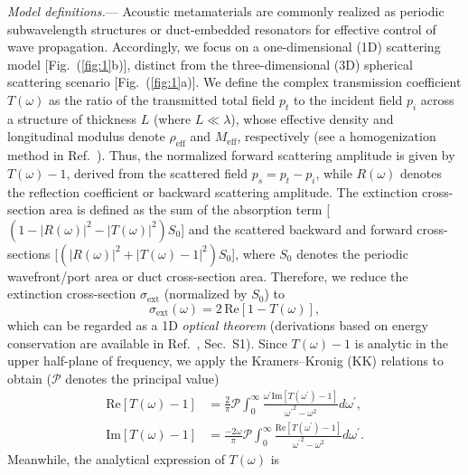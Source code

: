 \documentclass[final,5p,times,twocolumn]{elsarticle}
\begin{document}
\textit{Model definitions.}— Acoustic metamaterials are commonly realized as periodic subwavelength structures or duct-embedded resonators for effective control of wave propagation. Accordingly, we focus on a one-dimensional (1D) scattering model [Fig.~(\ref{fig:1}b)], distinct from the three-dimensional (3D) spherical scattering scenario [Fig.~(\ref{fig:1}a)]. We define the complex transmission coefficient $T(\omega)$ as the ratio of the transmitted total field $p_t$ to the incident field $p_i$ across a structure of thickness $L$ (where $L \ll \lambda$), whose effective density and longitudinal modulus denote $\rho_{\mathrm{eff}}$ and $M_{\mathrm{eff}}$, respectively (see a homogenization method in Ref.~\cite{yang2014homogenization}). Thus, the normalized forward scattering amplitude is given by $T(\omega) - 1$, derived from the scattered field $p_s = p_t - p_i$, while $R(\omega)$ denotes the reflection coefficient or backward scattering amplitude. {\color{black}The extinction cross-section area is defined as the sum of the absorption term [$(1 - |R(\omega)|^2 - |T(\omega)|^2) S_0$] and the scattered backward and forward cross-sections [$(|R(\omega)|^2 + |T(\omega) - 1|^2) S_0$], where $S_0$ denotes the periodic wavefront/port area or duct cross-section area. Therefore, we reduce the extinction cross-section $\sigma_\mathrm{ext}$ (normalized by $S_0$) to}
\begin{equation} \label{eq:1Dot}
	\sigma_\mathrm{ext}(\omega) = 2\,\mathrm{Re}[1 - T(\omega)],
\end{equation}
which can be regarded as a 1D \textit{optical theorem} ({\color{black}derivations based on energy conservation are available in Ref.~\cite{labelSM}, Sec.~S1}). Since $T(\omega) - 1$ is analytic in the upper half-plane of frequency, we apply the Kramers–Kronig (KK) relations \cite{waters2000applicability} to obtain ($\mathcal{P}$ denotes the principal value)
\begin{subequations}\label{eq:kk}
	\begin{align}
		\mathrm{Re}[T(\omega)-1] &= \frac{2}{\pi} \mathcal{P} \int_{0}^{\infty} \frac{\omega^\prime \mathrm{Im}[T(\omega^\prime)-1]}{{\omega^{\prime}}^2-\omega^2} d \omega^{\prime}, \label{eq:kk_a} \\
		\mathrm{Im}[T(\omega)-1] &= \frac{-2\omega}{\pi} \mathcal{P} \int_{0}^{\infty} \frac{\mathrm{Re}[T(\omega^\prime)-1]}{{\omega^{\prime}}^2-\omega^2} d \omega^{\prime}. \label{eq:kk_b}
	\end{align}
\end{subequations}
Meanwhile, the analytical expression of $T(\omega)$ is \cite{labelSM}
\end{document}
